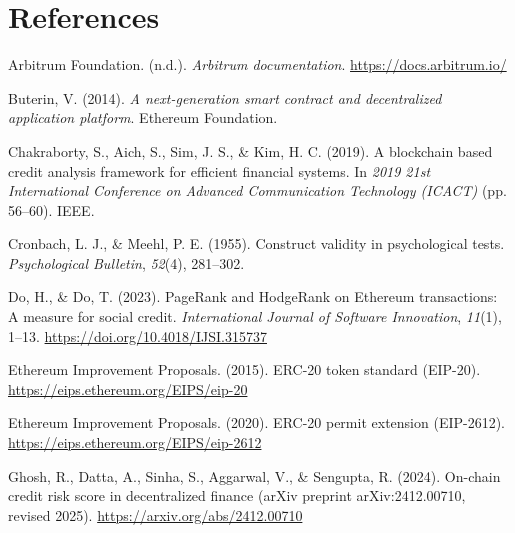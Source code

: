 \clearpage
{}
\section*{References}
\label{sec:references}

\hangindent=0.5in  Arbitrum Foundation. (n.d.). \textit{Arbitrum documentation}. \href{https://docs.arbitrum.io/}{https://docs.arbitrum.io/}\par

\hangindent=0.5in  Buterin, V. (2014). \textit{A next-generation smart contract and decentralized application platform}. Ethereum Foundation.\par

\hangindent=0.5in  Chakraborty, S., Aich, S., Sim, J. S., \& Kim, H. C. (2019). A blockchain based credit analysis framework for efficient financial systems. In \textit{2019 21st International Conference on Advanced Communication Technology (ICACT)} (pp. 56--60). IEEE.\par

\hangindent=0.5in  Cronbach, L. J., \& Meehl, P. E. (1955). Construct validity in psychological tests. \textit{Psychological Bulletin}, \textit{52}(4), 281--302.\par

\hangindent=0.5in  Do, H., \& Do, T. (2023). PageRank and HodgeRank on Ethereum transactions: A measure for social credit. \textit{International Journal of Software Innovation}, \textit{11}(1), 1--13. \href{https://doi.org/10.4018/IJSI.315737}{https://doi.org/10.4018/IJSI.315737}\par

\hangindent=0.5in  Ethereum Improvement Proposals. (2015). ERC-20 token standard (EIP-20). \href{https://eips.ethereum.org/EIPS/eip-20}{https://eips.ethereum.org/EIPS/eip-20}\par

\hangindent=0.5in  Ethereum Improvement Proposals. (2020). ERC-20 permit extension (EIP-2612). \href{https://eips.ethereum.org/EIPS/eip-2612}{https://eips.ethereum.org/EIPS/eip-2612}\par

\hangindent=0.5in  Ghosh, R., Datta, A., Sinha, S., Aggarwal, V., \& Sengupta, R. (2024). On-chain credit risk score in decentralized finance (arXiv preprint arXiv:2412.00710, revised 2025). \href{https://arxiv.org/abs/2412.00710}{https://arxiv.org/abs/2412.00710}\par

